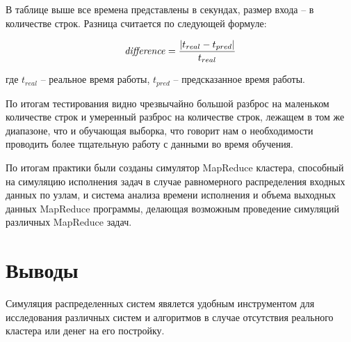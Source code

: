 \documentclass[a4paper,12pt]{article}
\begin{document}
    В таблице выше все времена представлены в секундах, размер входа -- в
    количестве строк. Разница считается по следующей формуле:

    \begin{equation}
        \text{\textit{difference}} = \frac{|t_{real} - t_{pred}|}{t_{real}}
    \end{equation}
    
    где $ t_{real} $ -- реальное время работы, $ t_{pred} $ -- предсказанное
    время работы.
    
    По итогам тестирования видно чрезвычайно большой разброс на маленьком
    количестве строк и умеренный разброс на количестве строк, лежащем в том же
    диапазоне, что и обучающая выборка, что говорит нам о необходимости
    проводить более тщательную работу с данными во время обучения.

    По итогам практики были созданы симулятор MapReduce кластера, способный на
    симуляцию исполнения задач в случае равномерного распределения входных
    данных по узлам, и система анализа времени исполнения и объема выходных
    данных MapReduce программы, делающая возможным проведение симуляций
    различных MapReduce задач.

    \section{Выводы}

    Симуляция распределенных систем явялется удобным инструментом для
    исследования различных систем и алгоритмов в случае отсутствия реального
    кластера или денег на его постройку.

    \newpage
    \printbibliography
\end{document}
